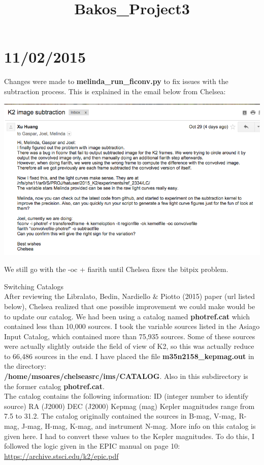 \documentclass[11pt,letterpaper]{book} %
\begin{document}
\section*{11/02/2015}
Changes were made to \textbf{melinda\_run\_ficonv.py} to fix issues with the subtraction process. This is explained in the email below from Chelsea:\\
\begin{center}
\includegraphics[width=\textwidth]{email1.png}\\
\end{center}
We still go with the -oc + fiarith until Chelsea fixes the bitpix problem.


\pagebreak

\title{Bakos_Project3}
{\Huge Switching Catalogs}\\[5mm]
After reviewing the Libralato, Bedin, Nardiello $\&$ Piotto (2015) paper (url listed below), Chelsea realized that one possible improvement we could make would be to update our catalog. We had been using a catalog named \textbf{photref.cat} which contained less than 10,000 sources. I took the variable sources listed in the Asiago Input Catalog, which contained more than 75,935 sources. Some of these sources were actually slightly outside the field of view of K2, so this was actually reduce to 66,486 sources in the end.  
I have placed the file \textbf{m35n2158\_kepmag.out} in the directory:\\ \textbf{/home/msoares/chelseasrc/ims/CATALOG}. 
Also in this subdirectory is the former catalog \textbf{photref.cat}. \\
The catalog contains the following information:
ID (integer number to identify source)   RA (J2000)   DEC (J2000)   Kepmag (mag)
Kepler magnitudes range from 7.5 to 31.2. 
The  catalog originally contained the sources in B-mag, V-mag, R-mag, J-mag, H-mag, K-mag, and instrument N-mag. More info on this catalog is given here. I had to convert these values to the Kepler magnitudes. To do this, I followed the logic given in the EPIC manual on page 10: \url{https://archive.stsci.edu/k2/epic.pdf}\\
\end{document}
